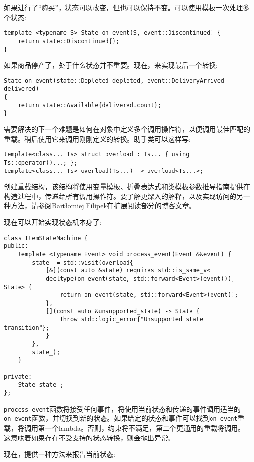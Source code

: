 如果进行了“购买”，状态可以改变，但也可以保持不变。可以使用模板一次处理多个状态:

\begin{lstlisting}[style=styleCXX]
template <typename S> State on_event(S, event::Discontinued) {
	return state::Discontinued{};
}
\end{lstlisting}

如果商品停产了，处于什么状态并不重要。现在，来实现最后一个转换:

\begin{lstlisting}[style=styleCXX]
State on_event(state::Depleted depleted, event::DeliveryArrived delivered)
{
	return state::Available{delivered.count};
}
\end{lstlisting}

需要解决的下一个难题是如何在对象中定义多个调用操作符，以便调用最佳匹配的重载。稍后使用它来调用刚刚定义的转换。助手类可以这样写:

\begin{lstlisting}[style=styleCXX]
template<class... Ts> struct overload : Ts... { using Ts::operator()...; };
template<class... Ts> overload(Ts...) -> overload<Ts...>;
\end{lstlisting}

创建重载结构，该结构将使用变量模板、折叠表达式和类模板参数推导指南提供在构造过程中，传递给所有调用操作符。要了解更深入的解释，以及实现访问的另一种方法，请参阅Bartłomiej Filipek在扩展阅读部分的博客文章。

现在可以开始实现状态机本身了:

\begin{lstlisting}[style=styleCXX]
class ItemStateMachine {
public:
	template <typename Event> void process_event(Event &&event) {
		state_ = std::visit(overload{
			[&](const auto &state) requires std::is_same_v<
			decltype(on_event(state, std::forward<Event>(event))), State> {
				return on_event(state, std::forward<Event>(event));
			},
			[](const auto &unsupported_state) -> State {
				throw std::logic_error{"Unsupported state transition"};
			}
		},
		state_);
	}

private:
	State state_;
};
\end{lstlisting}

\texttt{process\_event}函数将接受任何事件，将使用当前状态和传递的事件调用适当的\texttt{on\_event}函数，并切换到新的状态。如果给定的状态和事件可以找到\texttt{on\_event}重载，将调用第一个lambda。否则，约束将不满足，第二个更通用的重载将调用。这意味着如果存在不受支持的状态转换，则会抛出异常。

现在，提供一种方法来报告当前状态:

